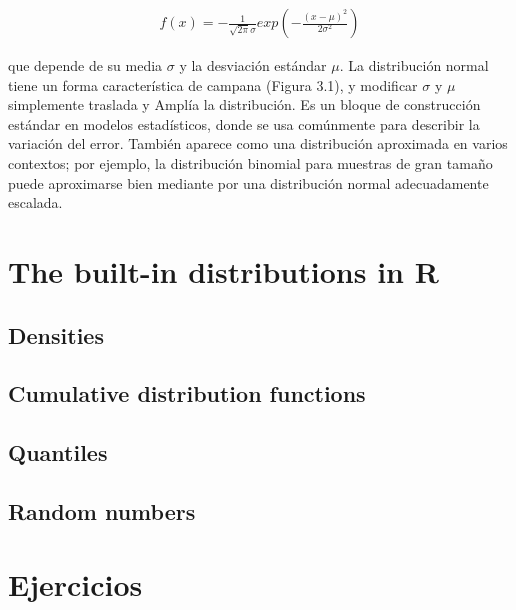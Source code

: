 \begingroup
\Large
\begin{gather*}
    f(x) = -\frac{1}{\sqrt{2\pi}\sigma}exp\left(-\frac{(x-\mu )^2}{2\sigma^2}\right)
\end{gather*}
\endgroup

que depende de su media $\sigma$ y la desviación estándar $\mu$. La distribución
normal tiene un forma característica de campana (Figura 3.1), y modificar
$\sigma$ y $\mu$ simplemente traslada y Amplía la distribución. Es un bloque de
construcción estándar en modelos estadísticos, donde se usa comúnmente para
describir la variación del error. También aparece como una distribución
aproximada en varios contextos; por ejemplo, la distribución binomial para
muestras de gran tamaño puede aproximarse bien mediante por una distribución
normal adecuadamente escalada.

\section{The built-in distributions in R}
\subsection{Densities}
\subsection{Cumulative distribution functions}
\subsection{Quantiles}
\subsection{Random numbers}
\section{Ejercicios}
\newpage
